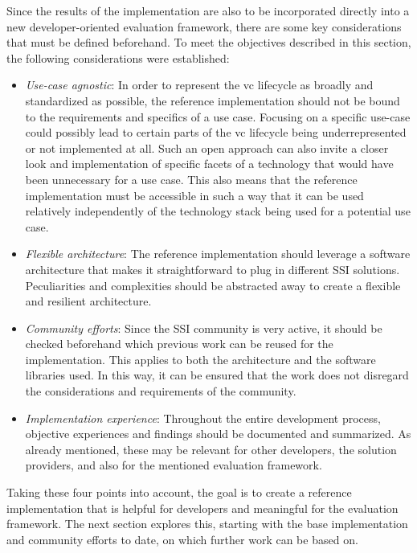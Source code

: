     Since the results of the implementation are also to be incorporated directly into a new developer-oriented evaluation framework, there are some key considerations that must be defined beforehand. To meet the objectives described in this section, the following considerations were established:
    \begin{itemize}
        \item \textit{Use-case agnostic}: In order to represent the \ac{vc} lifecycle as broadly and standardized as possible, the reference implementation should not be bound to the requirements and specifics of a use case. Focusing on a specific use-case could possibly lead to certain parts of the \ac{vc} lifecycle being underrepresented or not implemented at all. Such an open approach can also invite a closer look and implementation of specific facets of a technology that would have been unnecessary for a use case. This also means that the reference implementation must be accessible in such a way that it can be used relatively independently of the technology stack being used for a potential use case.
        \item \textit{Flexible architecture}: The reference implementation should leverage a software architecture that makes it straightforward to plug in different \ac{SSI} solutions. Peculiarities and complexities should be abstracted away to create a flexible and resilient architecture. 
        \item \textit{Community efforts}: Since the \ac{SSI} community is very active, it should be checked beforehand which previous work can be reused for the implementation. This applies to both the architecture and the software libraries used. In this way, it can be ensured that the work does not disregard the considerations and requirements of the community.
        \item \textit{Implementation experience}: Throughout the entire development process, objective experiences and findings should be documented and summarized. As already mentioned, these may be relevant for other developers, the solution providers, and also for the mentioned evaluation framework.
    \end{itemize}
    
    Taking these four points into account, the goal is to create a reference implementation that is helpful for developers and meaningful for the evaluation framework. The next section explores this, starting with the base implementation and community efforts to date, on which further work can be based on.
    

